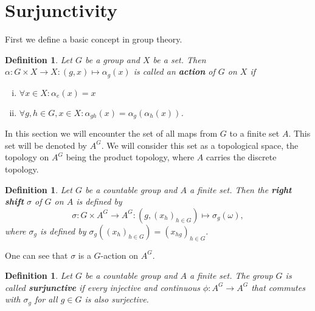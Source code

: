 \documentclass[titlepage, a4paper]{article}
\newtheorem{definition}[theorem]{Definition}
\theoremstyle{remark}
\begin{document}
 

    \section{Surjunctivity}\label{sec:surjunctivity}

    First we define a basic concept in group theory.

    \begin{definition} %
	    Let $G$ be a group and $X$ be a set. Then $\alpha: G \times X \to X: (g,x) \mapsto \alpha_g(x)$ is called an \textbf{action} of $G$ on $X$ if
        \begin{enumerate}[(i)]
            \item $\forall x \in X: \alpha_e(x) = x$
            \item $\forall g,h \in G, x\in X: \alpha_{gh}(x) = \alpha_g(\alpha_h(x))$.
        \end{enumerate}
    \end{definition}

    In this section we will encounter the set of all maps from $G$ to a finite set $A$. This set will be denoted by $A^G$. We will consider this set as a topological space, the topology on $A^G$ being the product topology, where $A$ carries the discrete topology.

    \begin{definition}
	    Let $G$ be a countable group and $A$ a finite set. Then the \textbf{right shift} $\sigma$ of $G$ on $A$ is defined by
        \[
        \sigma: G \times A^G \to A^G: \left(g, (x_{h})_{h \in G} \right) \mapsto \sigma_g(\omega),
        \]
        where $\sigma_g$ is defined by $\sigma_g\left( (x_{h})_{h \in G} \right) = \left( x_{hg} \right)_{h \in G}$. %
    \end{definition}

    One can see that $\sigma$ is a $G$-action on $A^G$.
    \begin{definition}
	    Let $G$ be a countable group and $A$ a finite set. The group $G$ is called \textbf{surjunctive} if every injective and continuous $\phi: A^{G}\to A^{G}$ that commutes with $\sigma_g$ for all $g \in G$ is also surjective.
    \end{definition}
\end{document}
